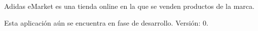 Adidas e\+Market es una tienda online en la que se venden productos de la marca.

Esta aplicación aún se encuentra en fase de desarrollo. Versión\+: 0. 